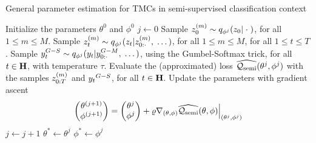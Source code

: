 \begin{algorithm}[htbp!]
    \caption{General parameter estimation for TMCs in semi-supervised classification context}
    \label{algo:algo_train_tmc_semi}
  \begin{algorithmic}[1]
    \State Initialize the parameters $\theta^0$ and $\phi^0$
    \State $j\leftarrow 0$\label{line:start_vtmc_semi}
      \State Sample $z_0^{(m)}\sim q_{\phi^{{j}}}(z_0|\; \cdot \;)$,  
      for all  $1 \leq m \leq M$.
      \State Sample $z_t^{(m)}\sim q_{\phi^{{j}}}(z_t|z_{0:\cdot}^{(m)},\; \dots)$,   for all  $1 \leq m \leq M$, for all $1 \leq t \leq T$. 
    \State Sample $y_t^{G-S} \sim q_{\phi^{{j}}}(y_t|y_{0:\cdot}^{G-M}, \; \dots)$,
        using the Gumbel-Softmax trick, for all $t \in \mathbf{H}$, 
        with temperature $\tau$. \label{line:sample_gumbel_softmax}
    \State Evaluate the (approximated) loss $\widehat{\mathcal{Q}_{\mathrm{semi}}}(\theta^{{j}},\phi^{{j}})$
        with the samples $z_{0:T}^{(m)}$ and ${y_t}^{G-S}$, for all $t \in \mathbf{H}$.
    \label{line:derivate_tmc_semi} 
      \State Update the parameters with gradient ascent
    \begin{equation}
    \begin{pmatrix}\theta^{(j+1)}\\\phi^{(j+1)}\end{pmatrix}=
    \begin{pmatrix}\theta^{{j}}\\\phi^{{j}}\end{pmatrix}
    + \varrho {\nabla_{(\theta, \phi)} \widehat{\mathcal{Q}_{\mathrm{semi}}}(\theta,\phi)}\Big|_{(\theta^{{j}},\phi^{{j}})}
    \label{eq:elbo_grad_vtmc}
    \end{equation}
    \State  $j\leftarrow j+1$
    \EndWhile
    \State  $\theta^{*} \leftarrow \theta^{{j}}$
    \State  $\phi^{*} \leftarrow \phi^{{j}}$
    \label{line:end_dtmc_tmc_semi}
  \end{algorithmic}
\end{algorithm}

